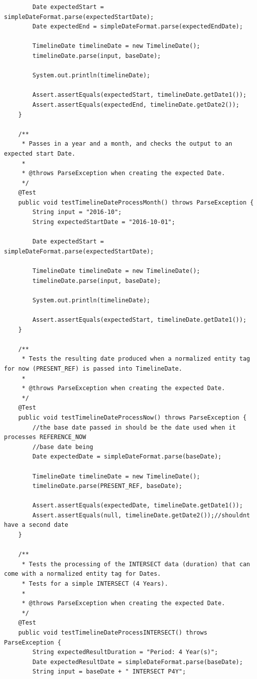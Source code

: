 \begin{lstlisting}
        Date expectedStart = simpleDateFormat.parse(expectedStartDate);
        Date expectedEnd = simpleDateFormat.parse(expectedEndDate);

        TimelineDate timelineDate = new TimelineDate();
        timelineDate.parse(input, baseDate);

        System.out.println(timelineDate);

        Assert.assertEquals(expectedStart, timelineDate.getDate1());
        Assert.assertEquals(expectedEnd, timelineDate.getDate2());
    }

    /**
     * Passes in a year and a month, and checks the output to an expected start Date.
     *
     * @throws ParseException when creating the expected Date.
     */
    @Test
    public void testTimelineDateProcessMonth() throws ParseException {
        String input = "2016-10";
        String expectedStartDate = "2016-10-01";

        Date expectedStart = simpleDateFormat.parse(expectedStartDate);

        TimelineDate timelineDate = new TimelineDate();
        timelineDate.parse(input, baseDate);

        System.out.println(timelineDate);

        Assert.assertEquals(expectedStart, timelineDate.getDate1());
    }

    /**
     * Tests the resulting date produced when a normalized entity tag for now (PRESENT_REF) is passed into TimelineDate.
     *
     * @throws ParseException when creating the expected Date.
     */
    @Test
    public void testTimelineDateProcessNow() throws ParseException {
        //the base date passed in should be the date used when it processes REFERENCE_NOW
        //base date being
        Date expectedDate = simpleDateFormat.parse(baseDate);

        TimelineDate timelineDate = new TimelineDate();
        timelineDate.parse(PRESENT_REF, baseDate);

        Assert.assertEquals(expectedDate, timelineDate.getDate1());
        Assert.assertEquals(null, timelineDate.getDate2());//shouldnt have a second date
    }

    /**
     * Tests the processing of the INTERSECT data (duration) that can come with a normalized entity tag for Dates.
     * Tests for a simple INTERSECT (4 Years).
     *
     * @throws ParseException when creating the expected Date.
     */
    @Test
    public void testTimelineDateProcessINTERSECT() throws ParseException {
        String expectedResultDuration = "Period: 4 Year(s)";
        Date expectedResultDate = simpleDateFormat.parse(baseDate);
        String input = baseDate + " INTERSECT P4Y";


\end{lstlisting}
